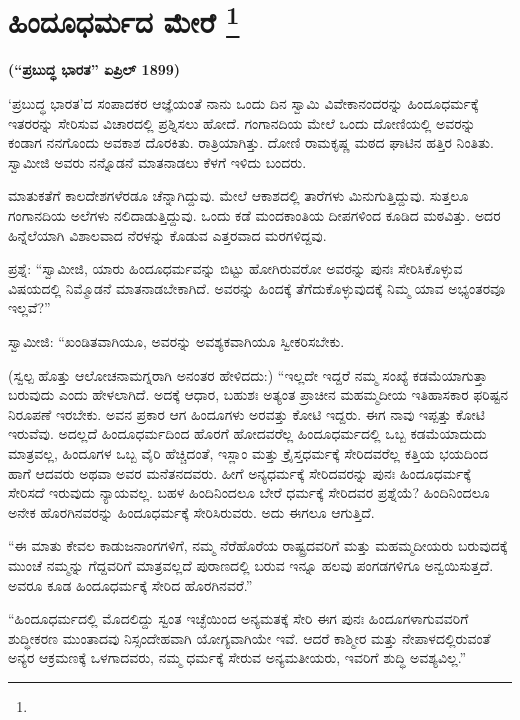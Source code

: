 
\chapter[ಹಿಂದೂಧರ್ಮದ ಮೇರೆ ]{ಹಿಂದೂಧರ್ಮದ ಮೇರೆ \protect\footnote{}}

\centerline{\textbf{(“ಪ್ರಬುದ್ಧ ಭಾರತ” ಏಪ್ರಿಲ್​ 1899)}}

‘ಪ್ರಬುದ್ಧ ಭಾರತ’ದ ಸಂಪಾದಕರ ಆಜ್ಞೆಯಂತೆ ನಾನು ಒಂದು ದಿನ ಸ್ವಾಮಿ ವಿವೇಕಾನಂದರನ್ನು ಹಿಂದೂಧರ್ಮಕ್ಕೆ ಇತರರನ್ನು ಸೇರಿಸುವ ವಿಚಾರದಲ್ಲಿ ಪ್ರಶ್ನಿಸಲು ಹೋದೆ. ಗಂಗಾನದಿಯ ಮೇಲೆ ಒಂದು ದೋಣಿಯಲ್ಲಿ ಅವರನ್ನು ಕಂಡಾಗ ನನಗೊಂದು ಅವಕಾಶ ದೊರಕಿತು. ರಾತ್ರಿಯಾಗಿತ್ತು. ದೋಣಿ ರಾಮಕೃಷ್ಣ ಮಠದ ಘಾಟಿನ ಹತ್ತಿರ ನಿಂತಿತು. ಸ್ವಾಮೀಜಿ ಅವರು ನನ್ನೊಡನೆ ಮಾತನಾಡಲು ಕೆಳಗೆ ಇಳಿದು ಬಂದರು.

\vskip 5pt

ಮಾತುಕತೆಗೆ ಕಾಲದೇಶಗಳೆರಡೂ ಚೆನ್ನಾಗಿದ್ದುವು. ಮೇಲೆ ಆಕಾಶದಲ್ಲಿ ತಾರೆಗಳು ಮಿನುಗುತ್ತಿದ್ದುವು. ಸುತ್ತಲೂ ಗಂಗಾನದಿಯ ಅಲೆಗಳು ನಲಿದಾಡುತ್ತಿದ್ದುವು. ಒಂದು ಕಡೆ ಮಂದಕಾಂತಿಯ ದೀಪಗಳಿಂದ ಕೂಡಿದ ಮಠವಿತ್ತು. ಅದರ ಹಿನ್ನೆಲೆಯಾಗಿ ವಿಶಾಲವಾದ ನೆರಳನ್ನು ಕೊಡುವ ಎತ್ತರವಾದ ಮರಗಳಿದ್ದವು.

\vskip 5pt

ಪ್ರಶ್ನೆ: “ಸ್ವಾಮೀಜಿ, ಯಾರು ಹಿಂದೂಧರ್ಮವನ್ನು ಬಿಟ್ಟು ಹೋಗಿರುವರೋ ಅವರನ್ನು ಪುನಃ ಸೇರಿಸಿಕೊಳ್ಳುವ ವಿಷಯದಲ್ಲಿ ನಿಮ್ಮೊಡನೆ ಮಾತನಾಡಬೇಕಾಗಿದೆ. ಅವರನ್ನು ಹಿಂದಕ್ಕೆ ತೆಗೆದುಕೊಳ್ಳುವುದಕ್ಕೆ ನಿಮ್ಮ ಯಾವ ಅಭ್ಯಂತರವೂ ಇಲ್ಲವೆ?”

\vskip 5pt

ಸ್ವಾಮೀಜಿ: “ಖಂಡಿತವಾಗಿಯೂ, ಅವರನ್ನು ಅವಶ್ಯಕವಾಗಿಯೂ ಸ್ವೀಕರಿಸಬೇಕು.

\vskip 5pt

(ಸ್ವಲ್ಪ ಹೊತ್ತು ಆಲೋಚನಾಮಗ್ನರಾಗಿ ಅನಂತರ ಹೇಳಿದದು:) “ಇಲ್ಲದೇ ಇದ್ದರೆ ನಮ್ಮ ಸಂಖ್ಯೆ ಕಡಮೆಯಾಗುತ್ತಾ ಬರುವುದು ಎಂದು ಹೇಳಲಾಗಿದೆ. ಅದಕ್ಕೆ ಆಧಾರ, ಬಹುಶಃ ಅತ್ಯಂತ ಪ್ರಾಚೀನ ಮಹಮ್ಮದೀಯ ಇತಿಹಾಸಕಾರ ಫರಿಷ್ಟನ ನಿರೂಪಣೆ ಇರಬೇಕು. ಅವನ ಪ್ರಕಾರ ಆಗ ಹಿಂದೂಗಳು ಅರವತ್ತು ಕೋಟಿ ಇದ್ದರು. ಈಗ ನಾವು ಇಪ್ಪತ್ತು ಕೋಟಿ ಇರುವೆವು. ಅದಲ್ಲದೆ ಹಿಂದೂಧರ್ಮದಿಂದ ಹೊರಗೆ ಹೋದವರೆಲ್ಲ ಹಿಂದೂಧರ್ಮದಲ್ಲಿ ಒಬ್ಬ ಕಡಮೆಯಾದುದು ಮಾತ್ರವಲ್ಲ, ಹಿಂದೂಗಳ ಒಬ್ಬ ವೈರಿ ಹೆಚ್ಚಿದಂತೆ, ಇಸ್ಲಾಂ ಮತ್ತು ಕ್ರೈಸ್ತಧರ್ಮಕ್ಕೆ ಸೇರಿದವರೆಲ್ಲ ಕತ್ತಿಯ ಭಯದಿಂದ ಹಾಗೆ ಆದವರು ಅಥವಾ ಅವರ ಮನೆತನದವರು. ಹೀಗೆ ಅನ್ಯಧರ್ಮಕ್ಕೆ ಸೇರಿದವರನ್ನು ಪುನಃ ಹಿಂದೂಧರ್ಮಕ್ಕೆ ಸೇರಿಸದೆ ಇರುವುದು ನ್ಯಾಯವಲ್ಲ. ಬಹಳ ಹಿಂದಿನಿಂದಲೂ ಬೇರೆ ಧರ್ಮಕ್ಕೆ ಸೇರಿದವರ ಪ್ರಶ್ನೆಯೆ? ಹಿಂದಿನಿಂದಲೂ ಅನೇಕ ಹೊರಗಿನವರನ್ನು ಹಿಂದೂಧರ್ಮಕ್ಕೆ ಸೇರಿಸಿರುವರು. ಅದು ಈಗಲೂ ಆಗುತ್ತಿದೆ.

\vskip 5pt

“ಈ ಮಾತು ಕೇವಲ ಕಾಡುಜನಾಂಗಗಳಿಗೆ, ನಮ್ಮ ನೆರೆಹೊರೆಯ ರಾಷ್ಟ್ರದವರಿಗೆ ಮತ್ತು ಮಹಮ್ಮದೀಯರು ಬರುವುದಕ್ಕೆ ಮುಂಚೆ ನಮ್ಮನ್ನು ಗೆದ್ದವರಿಗೆ ಮಾತ್ರವಲ್ಲದೆ ಪುರಾಣದಲ್ಲಿ ಬರುವ ಇನ್ನೂ ಹಲವು ಪಂಗಡಗಳಿಗೂ ಅನ್ವಯಿಸುತ್ತದೆ. ಅವರೂ ಕೂಡ ಹಿಂದೂಧರ್ಮಕ್ಕೆ ಸೇರಿದ ಹೊರಗಿನವರೆ.”

“ಹಿಂದೂಧರ್ಮದಲ್ಲಿ ಮೊದಲಿದ್ದು ಸ್ವಂತ ಇಚ್ಛೆಯಿಂದ ಅನ್ಯಮತಕ್ಕೆ ಸೇರಿ ಈಗ ಪುನಃ ಹಿಂದೂಗಳಾಗುವವರಿಗೆ ಶುದ್ಧೀಕರಣ ಮುಂತಾದವು ನಿಸ್ಸಂದೇಹವಾಗಿ ಯೋಗ್ಯವಾಗಿಯೇ ಇವೆ. ಆದರೆ ಕಾಶ್ಮೀರ ಮತ್ತು ನೇಪಾಳದಲ್ಲಿರುವಂತೆ ಅನ್ಯರ ಆಕ್ರಮಣಕ್ಕೆ ಒಳಗಾದವರು, ನಮ್ಮ ಧರ್ಮಕ್ಕೆ ಸೇರುವ ಅನ್ಯಮತೀಯರು, ಇವರಿಗೆ ಶುದ್ಧಿ ಅವಶ್ಯವಿಲ್ಲ.”

